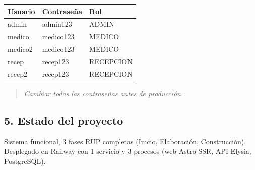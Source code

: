 \documentclass[11pt,letterpaper]{article}
\begin{document}
\begin{table}[H]
\centering
\small
\renewcommand{\arraystretch}{1.3}
\begin{tabularx}{\linewidth}{>{\RaggedRight\arraybackslash}X>{\RaggedRight\arraybackslash}X>{\RaggedRight\arraybackslash}X}
\toprule
\textbf{\textcolor{brand-800}{Usuario}} & \textbf{\textcolor{brand-800}{Contraseña}} & \textbf{\textcolor{brand-800}{Rol}} \\
\midrule
admin & admin123 & ADMIN \\
medico & medico123 & MEDICO \\
medico2 & medico123 & MEDICO \\
recep & recep123 & RECEPCION \\
recep2 & recep123 & RECEPCION \\
\bottomrule
\end{tabularx}
\end{table}
\begin{quote}\itshape Cambiar todas las contraseñas antes de producción.\end{quote}

\hrulefill

\subsection{5. Estado del proyecto}

Sistema funcional, 3 fases RUP completas (Inicio, Elaboración, Construcción). Desplegado en Railway con 1 servicio y 3 procesos (web Astro SSR, API Elysia, PostgreSQL).
\end{document}
